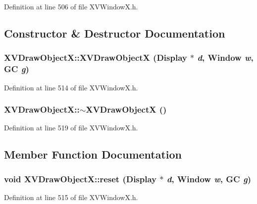 Definition at line 506 of file XVWindow\-X.h.

\subsection{Constructor \& Destructor Documentation}
\label{XVDrawObjectX_a0}
\hypertarget{class_XVDrawObjectX_a0}{
\subsubsection[XVDrawObjectX]{\setlength{\rightskip}{0pt plus 5cm}XVDraw\-Object\-X::XVDraw\-Object\-X (Display $\ast$ {\em d}, Window {\em w}, GC {\em g})}}




Definition at line 514 of file XVWindow\-X.h.\label{XVDrawObjectX_a2}
\hypertarget{class_XVDrawObjectX_a2}{
\subsubsection[~XVDrawObjectX]{\setlength{\rightskip}{0pt plus 5cm}XVDraw\-Object\-X::$\sim$XVDraw\-Object\-X ()}}




Definition at line 519 of file XVWindow\-X.h.

\subsection{Member Function Documentation}
\label{XVDrawObjectX_a1}
\hypertarget{class_XVDrawObjectX_a1}{
\subsubsection[reset]{\setlength{\rightskip}{0pt plus 5cm}void XVDraw\-Object\-X::reset (Display $\ast$ {\em d}, Window {\em w}, GC {\em g})}}




Definition at line 515 of file XVWindow\-X.h.

